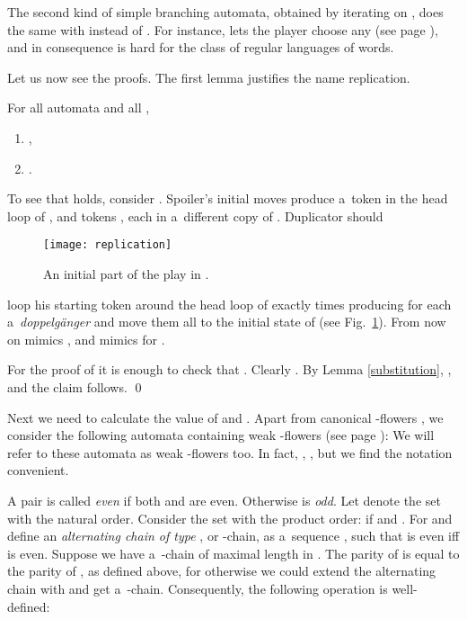 \documentclass{LMCS}
\begin{document}
The second kind of simple branching automata, obtained by iterating  on , does the same with  instead of . For instance,  lets the player choose any  (see page \pageref{hat}), and in consequence  is hard for the class of regular languages of words.

Let us now see the proofs. The first lemma justifies the name replication. 

\begin{lem} \label{replication} For all automata  and all , 
\begin{enumerate}[\em(1)]
\item ,
\item .
\end{enumerate} 
\end{lem} 

\proof To see that  holds,  consider . Spoiler's initial moves produce a~token  in the head loop of , and
tokens , each in a~different copy of . Duplicator should
\begin{figure}
\centering
\texttt{[image: replication]}
\caption{An initial part of the play in .}
\label{fig:replication}
\end{figure}
loop his starting token  around the head loop of  exactly  times producing for each  a~{\em doppelg\"anger}  and move them all to the initial state of  (see Fig.~\ref{fig:replication}). From now on  mimics , and  mimics  for . 

For the proof of  it is enough to check that .  Clearly . By Lemma \ref{substitution}, , and the claim follows. \qed

\vspace{5pt}

Next we need to calculate the value of  and . Apart from canonical -flowers , we consider the following automata containing weak -flowers (see page \pageref{weakflowers}):   We will refer to these automata as weak -flowers too. In fact, , , but we find the notation convenient.\label{canonicalweakflowers} 

A pair  is called {\em even} if both  and  are even. Otherwise  is {\em odd}. Let  denote the set  with the natural order. Consider the set  with the product order:  if  and . For  and  define an {\em alternating chain of type },  or -chain, as a~sequence , such that  is even iff  is even. Suppose we have a~-chain of maximal length in . The parity of  is equal to the parity of , as defined above, for otherwise we could extend the alternating chain with  and get a~-chain. Consequently, the following operation is well-defined: 
\end{document}
